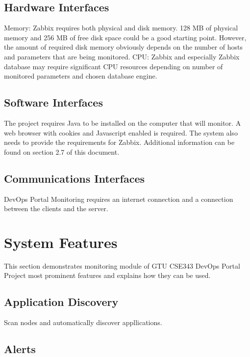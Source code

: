 \documentclass{article}
\begin{document}
\subsection{Hardware Interfaces}

Memory:
    Zabbix requires both physical and disk memory. 128 MB of physical memory and 256 MB of free disk space could be a good starting point. However, the amount of required disk memory obviously depends on the number of hosts and parameters that are being monitored.
CPU:
   Zabbix and especially Zabbix database may require significant CPU resources depending on number of monitored parameters and chosen database engine.

\subsection{Software Interfaces}

     The project requires Java to be installed on the computer that will monitor. A web browser with cookies and Javascript enabled is required. The system also needs to provide the requirements for Zabbix. Additional information can be found on section 2.7 of this document.



\subsection{Communications Interfaces}

DevOps Portal Monitoring requires an internet connection and a connection between the clients and the server.

\section{System Features}


This section demonstrates monitoring module of GTU CSE343 DevOps Portal Project most prominent features and explains how they can be used.


\subsection{Application Discovery}

Scan nodes and automatically discover appllications.



\subsection{Alerts}
\end{document}
